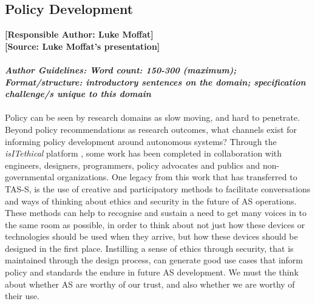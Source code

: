 \documentclass[sigconf]{acmart}
\begin{document}
\subsection{Policy Development}
\textbf{[Responsible Author:  Luke Moffat]}\\
\textbf{[Source: Luke Moffat's presentation]} 
\\\\
\noindent\textbf{\textit{Author Guidelines: Word count: 150-300 (maximum); \\Format/structure: introductory sentences on the domain; specification challenge/s unique to this domain}}\\\\

Policy can be seen by research domains as slow moving, and hard to penetrate. Beyond policy recommendations as research outcomes, what channels exist for informing policy development around autonomous systems? Through the \textit{isITethical} platform \cite{isITethical}, some work has been completed in collaboration with engineers, designers, programmers, policy advocates and publics and non-governmental organizations. One legacy from this work that has transferred to TAS-S, is the use of creative and participatory methods to facilitate conversations and ways of thinking about ethics and security in the future of AS operations. These methods can help to recognise and sustain a need to get many voices in to the same room as possible, in order to think about not just how these devices or technologies should be used when they arrive, but how these devices should be designed in the first place. Instilling a sense of ethics through security, that is maintained through the design process, can generate good use cases that inform policy and standards the endure in future AS development. We must the think about whether AS are worthy of our trust, and also whether we are worthy of their use.
\end{document}
